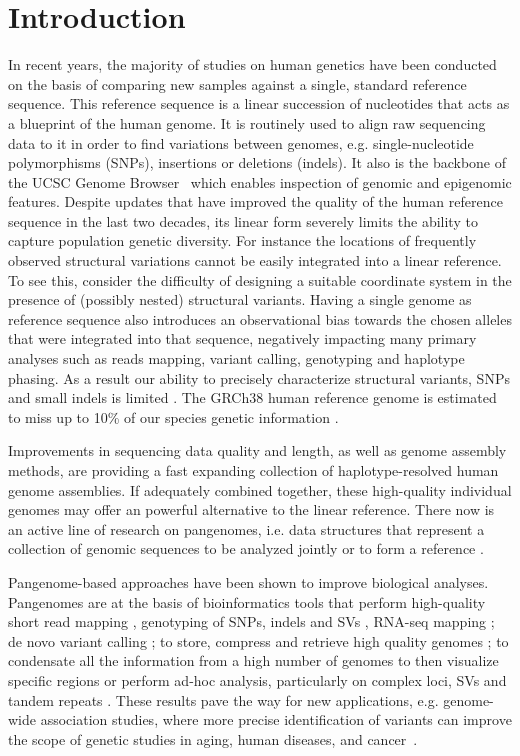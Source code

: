 \section{Introduction}
In recent years, the majority of studies on human genetics have been conducted on the basis of comparing new samples against a single, standard reference sequence. This reference sequence is a linear succession of nucleotides that acts as a blueprint of the human genome. It is routinely used to align raw sequencing data to it in order to find variations between genomes, e.g. single-nucleotide polymorphisms (SNPs), insertions or deletions (indels). It also is the backbone of the UCSC Genome Browser~\cite{ucsc} which enables inspection of genomic and epigenomic features. Despite updates that have improved the quality of the human reference sequence in the last two decades, its linear form severely limits the ability to capture population genetic diversity. For instance the locations of frequently observed structural variations cannot be easily integrated into a linear reference. To see this, consider the difficulty of designing a suitable coordinate system in the presence of (possibly nested) structural variants. Having a single genome as reference sequence also introduces an observational bias towards the chosen alleles that were integrated into that sequence, negatively impacting many primary analyses such as reads mapping, variant calling, genotyping and haplotype phasing. As a result our ability to precisely characterize structural variants, SNPs and small indels is limited \cite{vg,computational_pangenomics,giraffe}. The GRCh38 human reference genome is estimated to miss up to 10\% of our species genetic information \mbox{\cite{human-pangenomics-era}}.

Improvements in sequencing data quality and length, as well as  genome assembly methods, are providing a fast expanding collection of haplotype-resolved human genome assemblies. If adequately combined together, these high-quality individual genomes may offer an powerful alternative to the linear reference. There now is an active line of research on pangenomes, i.e. data structures that represent a collection of genomic sequences to be analyzed jointly or to form a reference \cite{computational_pangenomics,hpp}. 

Pangenome-based approaches have been shown to improve biological analyses. Pangenomes are at the basis of bioinformatics tools that perform high-quality short read mapping \mbox{\cite{giraffe}}, genotyping of SNPs, indels and SVs \mbox{\cite{pangenie}}, RNA-seq mapping \mbox{\cite{hdpr}}; de novo variant calling \mbox{\cite{vg}}; to store, compress and retrieve high quality genomes \mbox{\cite{gbz}}; to condensate all the information from a high number of genomes to then visualize specific regions or perform ad-hoc analysis, particularly on complex loci, SVs and tandem repeats \mbox{\cite{hdpr}}.
These results pave the way for new applications, e.g. genome-wide association studies, where more precise identification of variants can improve the scope of genetic studies in aging, human diseases, and cancer~\cite{computational_pangenomics, hpp}.

